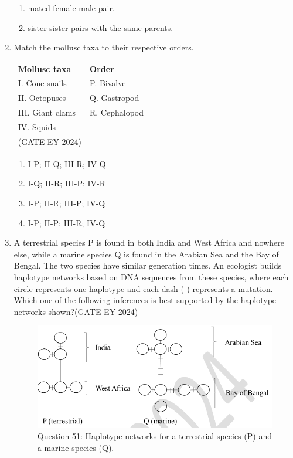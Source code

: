 \begin{enumerate}
\begin{enumerate}
        \item mated female-male pair.
        \item sister-sister pairs with the same parents.
    \end{enumerate}
\item Match the mollusc taxa to their respective orders.
\begin{tabular}{ll}
\textbf{Mollusc taxa} & \textbf{Order} \\
I. Cone snails & P. Bivalve \\
II. Octopuses & Q. Gastropod \\
III. Giant clams & R. Cephalopod \\
IV. Squids & \\\hfill{(GATE EY 2024)}
\end{tabular}
    \begin{multicols}{2}
    \begin{enumerate}
        \item I-P; II-Q; III-R; IV-Q
        \item I-Q; II-R; III-P; IV-R
        \item I-P; II-R; III-P; IV-Q
        \item I-P; II-P; III-R; IV-Q
    \end{enumerate}
    \end{multicols}
\item A terrestrial species P is found in both India and West Africa and nowhere else, while a marine species Q is found in the Arabian Sea and the Bay of Bengal. The two species have similar generation times. An ecologist builds haplotype networks based on DNA sequences from these species, where each circle represents one haplotype and each dash (-) represents a mutation. Which one of the following inferences is best supported by the haplotype networks shown?\hfill{(GATE EY 2024)}
\begin{figure}[!ht]
    \centering
    \includegraphics[width=0.3\columnwidth]{figs/Q-51.png}
    \caption{Question 51: Haplotype networks for a terrestrial species (P) and a marine species (Q).}
    \label{Q.51}
\end{figure}


\end{enumerate}
